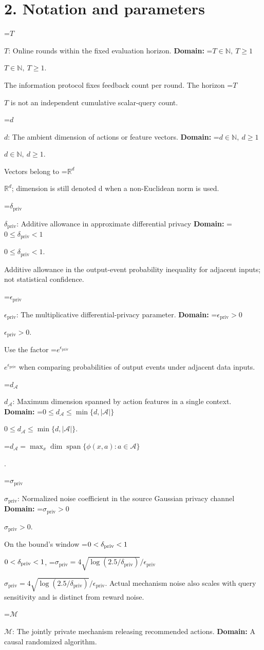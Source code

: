 \documentclass[10pt,a4paper]{article}
\newcommand{\AtlasMath}[1]{\par\begingroup\centering\setbox0=\hbox{$\displaystyle #1$}\ifdim\wd0>1.4\linewidth\typeout{ATLAS WIDE FORMULA: \the\wd0}\fi\ifdim\wd0>\linewidth\resizebox{\linewidth}{!}{\box0}\else\box0\fi\par\endgroup}
\newcommand{\AtlasInlineMath}[1]{\begingroup\setbox0=\hbox{$#1$}\ifdim\wd0>.4\linewidth\endgroup\AtlasMath{#1}\else\endgroup$#1$\fi}
\begin{document}
\section{2. Notation and parameters}
\AtlasInlineMath{T}: Online rounds within the fixed evaluation horizon. \textbf{Domain:} \AtlasInlineMath{T\in\mathbb N,\ T\ge1}.

The information protocol fixes feedback count per round. The horizon \AtlasInlineMath{T} is not an independent cumulative scalar-query count.

\AtlasInlineMath{d}: The ambient dimension of actions or feature vectors. \textbf{Domain:} \AtlasInlineMath{d\in\mathbb N,\ d\ge1}.

Vectors belong to \AtlasInlineMath{\mathbb R^d}; dimension is still denoted d when a non-Euclidean norm is used.

\AtlasInlineMath{\delta_{\mathrm{priv}}}: Additive allowance in approximate differential privacy \textbf{Domain:} \AtlasInlineMath{0\le\delta_{\mathrm{priv}}<1}.

Additive allowance in the output-event probability inequality for adjacent inputs; not statistical confidence.

\AtlasInlineMath{\epsilon_{\mathrm{priv}}}: The multiplicative differential-privacy parameter. \textbf{Domain:} \AtlasInlineMath{\epsilon_{\mathrm{priv}}>0}.

Use the factor \AtlasInlineMath{e^{\epsilon_{\mathrm{priv}}}} when comparing probabilities of output events under adjacent data inputs.

\AtlasInlineMath{d_{\mathcal A}}: Maximum dimension spanned by action features in a single context. \textbf{Domain:} \AtlasInlineMath{0\le d_{\mathcal A}\le\min\{d,|\mathcal A|\}}.


\AtlasMath{d_{\mathcal A}=\max_x\dim\operatorname{span}\{\phi(x,a):a\in\mathcal A\}}
.

\AtlasInlineMath{\sigma_{\mathrm{priv}}}: Normalized noise coefficient in the source Gaussian privacy channel \textbf{Domain:} \AtlasInlineMath{\sigma_{\mathrm{priv}}>0}.

On the bound's window \AtlasInlineMath{0<\delta_{\rm priv}<1}, \AtlasInlineMath{\sigma_{\mathrm{priv}}=4\sqrt{\log(2.5/\delta_{\mathrm{priv}})}/\epsilon_{\mathrm{priv}}}. Actual mechanism noise also scales with query sensitivity and is distinct from reward noise.

\AtlasInlineMath{\mathcal M}: The jointly private mechanism releasing recommended actions. \textbf{Domain:} A causal randomized algorithm.
\end{document}
